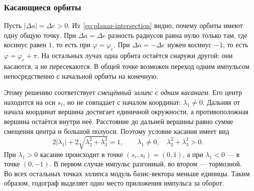 \subsubsection{Касающиеся орбиты}
\label{sec:planar-tangent}

Пусть $|\Delta a|=\Delta e>0$. Из~\eqref{eq:planar-intersection}
видно, почему орбиты имеют одну общую точку.
При $\Delta a=\Delta e$ разность радиусов равна нулю только там,
где косинус равен $1$, то есть при $\varphi=\varphi_e$.
При $\Delta a=-\Delta e$ нужен косинус $-1$,
то есть $\varphi=\varphi_e+\pi$.
На остальных лучах одна орбита остаётся снаружи другой:
они касаются, а не пересекаются. В общей точке возможен переход
одним импульсом непосредственно с начальной орбиты на конечную.

Этому решению соответствует \emph{смещённый эллипс с одним касанием}.
Его центр находится на оси $s_t$, но не совпадает с началом координат:
$\lambda_1\ne0$. Дальняя от начала координат вершина достигает
единичной окружности, а противоположная вершина остаётся внутри неё.
Расстояние до дальней вершины равно сумме смещения центра
и большой полуоси. Поэтому условие касания имеет вид
\begin{equation}
 2|\lambda_1|+2\sqrt{\lambda_2^2+\lambda_3^2}=1,
 \qquad \lambda_1\ne0,\quad \lambda_2^2+\lambda_3^2>0.
 \label{eq:planar-one-contact}
\end{equation}
При $\lambda_1>0$ касание происходит в точке $(s_r,s_t)=(0,1)$,
а при $\lambda_1<0$ --- в точке $(0,-1)$. В первом случае импульс
разгонный, во втором --- тормозной. Во всех остальных точках эллипса
модуль базис-вектора меньше единицы. Таким образом, годограф
выделяет одно место приложения импульса за оборот.



